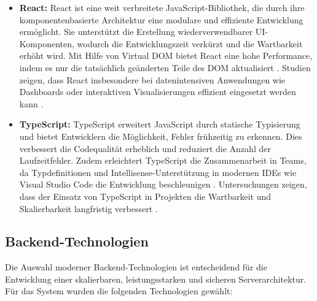 \begin{itemize}
    \item \textbf{React:}  
    React ist eine weit verbreitete JavaScript-Bibliothek, die durch ihre komponentenbasierte Architektur eine modulare und effiziente Entwicklung ermöglicht. Sie unterstützt die Erstellung wiederverwendbarer UI-Komponenten, wodurch die Entwicklungszeit verkürzt und die Wartbarkeit erhöht wird. Mit Hilfe von Virtual DOM bietet React eine hohe Performance, indem es nur die tatsächlich geänderten Teile des DOM aktualisiert \cite{stefanov2021react}. Studien zeigen, dass React insbesondere bei datenintensiven Anwendungen wie Dashboards oder interaktiven Visualisierungen effizient eingesetzt werden kann \cite{reactDocumentation}.

    \item \textbf{TypeScript:}  
    TypeScript erweitert JavaScript durch statische Typisierung und bietet Entwicklern die Möglichkeit, Fehler frühzeitig zu erkennen. Dies verbessert die Codequalität erheblich und reduziert die Anzahl der Laufzeitfehler. Zudem erleichtert TypeScript die Zusammenarbeit in Teams, da Typdefinitionen und Intellisense-Unterstützung in modernen IDEs wie Visual Studio Code die Entwicklung beschleunigen \cite{typeScriptDocumentation}. Untersuchungen zeigen, dass der Einsatz von TypeScript in Projekten die Wartbarkeit und Skalierbarkeit langfristig verbessert \cite{typescriptSurvey2021}.
\end{itemize}
\newpage

\subsection*{Backend-Technologien}
Die Auswahl moderner Backend-Technologien ist entscheidend für die Entwicklung einer skalierbaren, leistungsstarken und sicheren Serverarchitektur. Für das System wurden die folgenden Technologien gewählt:

